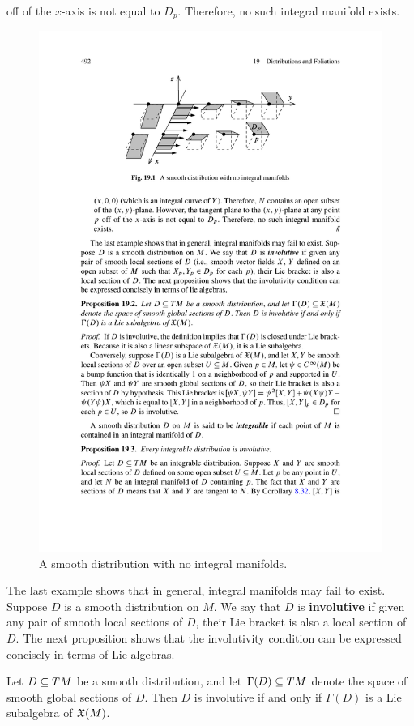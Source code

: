 \begin{example}
\begin{itemize}
off of the $x$-axis is not equal to $D_p$. Therefore, no such integral manifold exists.
\end{itemize}
\begin{figure}[htbp]
\centering
\includegraphics{pictures/distribution}
\caption{A smooth distribution with no integral manifolds.}
\end{figure}
\end{example}
The last example shows that in general, integral manifolds may fail to exist. Suppose
$D$ is a smooth distribution on $M$. We say that $D$ is \textbf{involutive} if given any pair of smooth local sections of $D$, their Lie bracket is also a local section of $D$. The next proposition shows that the involutivity condition can be expressed concisely in terms of Lie algebras.
\begin{proposition}
Let $D\subseteq TM$ be a smooth distribution, and let $\Gamma(D)\subseteq TM$ denote the space of smooth global sections of $D$. Then $D$ is involutive if and only if $\Gamma(D)$ is a Lie subalgebra of $\mathfrak{X}(M)$.
\end{proposition}
